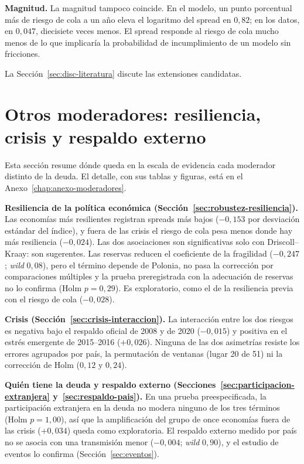 \textbf{Magnitud.} La magnitud tampoco coincide. En el modelo, un punto porcentual más de riesgo de cola a un año eleva el logaritmo del spread en $0{,}82$; en los datos, en $0{,}047$, diecisiete veces menos. El spread responde al riesgo de cola mucho menos de lo que implicaría la probabilidad de incumplimiento de un modelo sin fricciones.

La Sección~\ref{sec:disc-literatura} discute las extensiones candidatas.

\section{Otros moderadores: resiliencia, crisis y respaldo externo}
\label{sec:moderadores-resumen}

Esta sección resume dónde queda en la escala de evidencia cada moderador distinto de la deuda. El detalle, con sus tablas y figuras, está en el Anexo~\ref{chap:anexo-moderadores}.

\textbf{Resiliencia de la política económica (Sección~\ref{sec:robustez-resiliencia}).} Las economías más resilientes registran spreads más bajos ($-0{,}153$ por desviación estándar del índice), y fuera de las crisis el riesgo de cola pesa menos donde hay más resiliencia ($-0{,}024$). Las dos asociaciones son significativas solo con Driscoll--Kraay: son sugerentes. Las reservas reducen el coeficiente de la fragilidad ($-0{,}247$; \textit{wild} $0{,}08$), pero el término depende de Polonia, no pasa la corrección por comparaciones múltiples y la prueba preregistrada con la adecuación de reservas no lo confirma (Holm $p=0{,}29$). Es exploratorio, como el de la resiliencia previa con el riesgo de cola ($-0{,}028$).

\textbf{Crisis (Sección~\ref{sec:crisis-interaccion}).} La interacción entre los dos riesgos es negativa bajo el respaldo oficial de 2008 y de 2020 ($-0{,}015$) y positiva en el estrés emergente de 2015--2016 ($+0{,}026$). Ninguna de las dos asimetrías resiste los errores agrupados por país, la permutación de ventanas (lugar 20 de 51) ni la corrección de Holm ($0{,}12$ y $0{,}24$).

\textbf{Quién tiene la deuda y respaldo externo (Secciones~\ref{sec:participacion-extranjera} y~\ref{sec:respaldo-pais}).} En una prueba preespecificada, la participación extranjera en la deuda no modera ninguno de los tres términos (Holm $p=1{,}00$), así que la amplificación del grupo de once economías fuera de las crisis ($+0{,}034$) queda como exploratoria. El respaldo externo medido por país no se asocia con una transmisión menor ($-0{,}004$; \textit{wild} $0{,}90$), y el estudio de eventos lo confirma (Sección~\ref{sec:eventos}).

